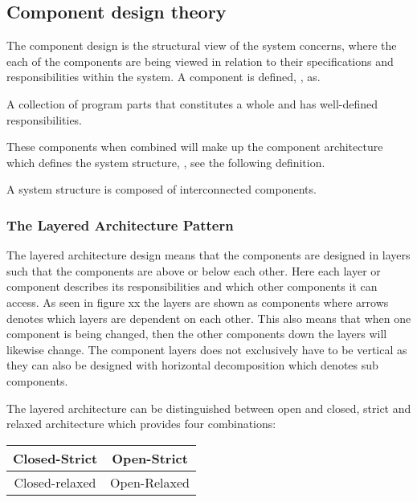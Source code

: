 \subsection{Component design theory} \label{sec:archicomponents}
The component design \cite{Rod-Aalborg} is the structural view of the system concerns, where the each of the components are being viewed in relation to their specifications and responsibilities within the system.
A component is defined, \citep[p.~192]{Rod-Aalborg}, as.
\begin{defn}\label{defn:component}
	A collection of program parts that constitutes a whole and has well-defined responsibilities.
\end{defn}

These components when combined will make up the component architecture which defines the system structure, \citep[p.~192]{Rod-Aalborg}, see the following definition.
\begin{defn}\label{defn:Structure}
	A system structure is composed of interconnected components.
\end{defn}

\subsubsection*{The Layered Architecture Pattern}

The layered architecture design means that the components are designed in layers such that the components are above or below each other.
Here each layer or component describes its responsibilities and which other components it can access.
As seen in {\color{red}figure xx} the layers are shown as components where arrows denotes which layers are dependent on each other.
This also means that when one component is being changed, then the other components down the layers will likewise change.
The component layers does not exclusively have to be vertical as they can also be designed with horizontal decomposition which denotes sub components.

The layered architecture can be distinguished between open and closed, strict and relaxed architecture which provides four combinations:

\begin{center}
	\begin{tabular}{| c | c |}
		\hline
		Closed-Strict & Open-Strict \\
		\hline
		Closed-relaxed & Open-Relaxed \\
		\hline
	\end{tabular}
\end{center}

